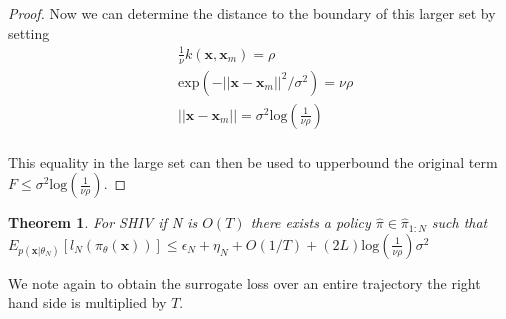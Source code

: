 \documentclass[10pt, conference]{ieeeconf}      %
\newtheorem{theorem}{Theorem}[section]
\newcommand{\bx}{\mathbf{x}}
\begin{document}
\begin{proof}
Now we can determine the distance to the boundary of this larger set by setting 
 \begin{align*}
&\frac{1}{\nu} k(\bx,\bx_m) = \rho\\
&\mbox{exp}(-||\bx-\bx_m||^2/\sigma^2)= \nu\rho\\
&||\bx-\bx_m|| = \sigma^2 \mbox{log}(\frac{1}{\nu\rho})\\
\end{align*}

This equality in the large set can then be used to upperbound the original term $F \leq \sigma^2 \mbox{log}(\frac{1}{\nu\rho})$. 

\end{proof}




\begin{theorem}\label{thm:main_thereom}
For SHIV if N is $O(T)$ there exists a policy $\hat{\pi} \in \hat{\pi}_{1:N}$ such that $E_{p(\bx|\theta_N)}[l_N(\pi_\theta(\bx))] \leq \epsilon_N  + \eta_N+ O(1/T)+(2L)\mbox{log}(\frac{1}{\nu\rho})\sigma^2$\\
\end{theorem}

We note again to obtain the surrogate loss over an entire trajectory the right hand side is multiplied by $T$. \\
\end{document}
